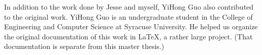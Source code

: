 \documentclass[../main/main.tex]{subfiles}
\begin{document}
In addition to the work done by Jesse and myself, YiHong Guo also contributed to the original work.  YiHong Guo is an undergraduate student in the College of Engineering and Computer Science at Syracuse University. He helped us organize the original documentation of this work in LaTeX, a rather large project. (That documentation is separate from this master thesis.)
\end{document}
